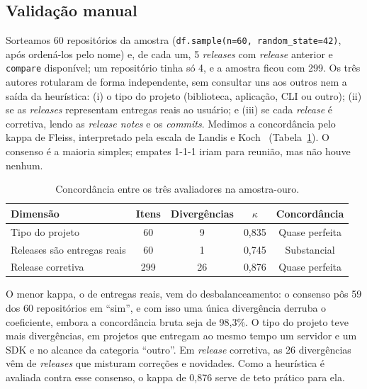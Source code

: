 
\subsection{Validação manual}

Sorteamos 60 repositórios da amostra (\texttt{df.sample(n=60, random\_state=42)}, após
ordená-los pelo nome) e, de cada um, 5 \textit{releases} com \textit{release} anterior e
\texttt{compare} disponível; um repositório tinha só 4, e a amostra ficou com 299. Os três
autores rotularam de forma independente, sem consultar uns aos outros nem a saída da
heurística: (i) o tipo do projeto (biblioteca, aplicação, CLI ou outro); (ii) se as
\textit{releases} representam entregas reais ao usuário; e (iii) se cada \textit{release} é
corretiva, lendo as \textit{release notes} e os \textit{commits}. Medimos a concordância pelo
kappa de Fleiss, interpretado pela escala de Landis e Koch~\cite{landis1977}
(Tabela~\ref{tab:kappa}). O consenso é a maioria simples; empates 1-1-1 iriam para reunião,
mas não houve nenhum.

\begin{table}[ht]
\centering
\caption{Concordância entre os três avaliadores na amostra-ouro.}
\label{tab:kappa}
\small
\begin{tabular}{lcccc}
\hline
\textbf{Dimensão} & \textbf{Itens} & \textbf{Divergências} & \textbf{$\kappa$} & \textbf{Concordância} \\
\hline
Tipo do projeto             & 60  & 9  & 0,835 & Quase perfeita \\
Releases são entregas reais & 60  & 1  & 0,745 & Substancial \\
Release corretiva           & 299 & 26 & 0,876 & Quase perfeita \\
\hline
\end{tabular}
\end{table}

O menor kappa, o de entregas reais, vem do desbalanceamento: o consenso pôs 59 dos 60
repositórios em ``sim'', e com isso uma única divergência derruba o coeficiente, embora a
concordância bruta seja de 98,3\%. O tipo do projeto teve mais divergências, em projetos que
entregam ao mesmo tempo um servidor e um SDK e no alcance da categoria ``outro''. Em
\textit{release} corretiva, as 26 divergências vêm de \textit{releases} que misturam correções
e novidades. Como a heurística é avaliada contra esse consenso, o kappa de 0,876 serve de teto
prático para ela.
